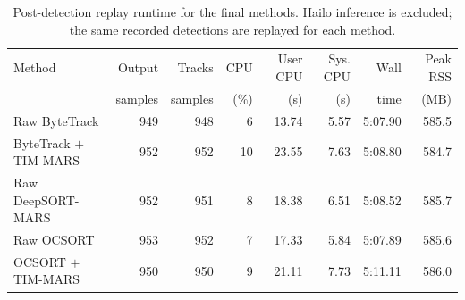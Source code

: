 \begin{table}[t]
\centering
\caption{Post-detection replay runtime for the final methods. Hailo inference is excluded; the same recorded detections are replayed for each method.}
\label{tab:final_compute_runtime}
\begin{tabular}{lrrrrrrr}
\toprule
Method & Output & Tracks & CPU & User CPU & Sys. CPU & Wall & Peak RSS \\
 & samples & samples & (\%) & (s) & (s) & time & (MB) \\
\midrule
Raw ByteTrack & 949 & 948 & 6 & 13.74 & 5.57 & 5:07.90 & 585.5 \\
ByteTrack $+$ TIM-MARS & 952 & 952 & 10 & 23.55 & 7.63 & 5:08.80 & 584.7 \\
Raw DeepSORT-MARS & 952 & 951 & 8 & 18.38 & 6.51 & 5:08.52 & 585.7 \\
Raw OCSORT & 953 & 952 & 7 & 17.33 & 5.84 & 5:07.89 & 585.6 \\
OCSORT $+$ TIM-MARS & 950 & 950 & 9 & 21.11 & 7.73 & 5:11.11 & 586.0 \\
\bottomrule
\end{tabular}
\end{table}
